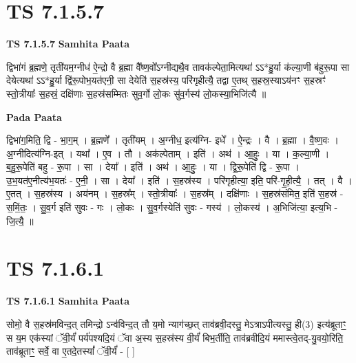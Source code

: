 \documentclass[17pt]{extarticle}
\begin{document}

\section{ TS 7.1.5.7 }

\textbf{TS 7.1.5.7 } \newline
\textbf{Samhita Paata} \newline

द्विभा॑गं ब्र॒ह्मणे॒ तृती॑यम॒ग्नीध॑ ऐ॒न्द्रो वै ब्र॒ह्मा वै᳚ष्ण॒वो᳚ऽग्नीद्यथै॒व तावक॑ल्पेता॒मित्यथा॑ ऽऽ*हु॒र्या क॑ल्या॒णी ब॑हुरू॒पा सा देयेत्यथा॑ ऽऽ*हु॒र्या द्वि॑रू॒पोभ॒यत॑एनी॒ सा देयेति॑ स॒हस्र॑स्य॒ परि॑गृहीत्यै॒ तद्वा ए॒तथ् स॒हस्र॒स्याऽय॑नꣳ स॒हस्रꣳ॑ स्तो॒त्रीयाः᳚ स॒हस्रं॒ दक्षि॑णाः स॒हस्र॑सम्मितः सुव॒र्गो लो॒कः सु॑व॒र्गस्य॑ लो॒कस्या॒भिजि॑त्यै ॥ \newline

\textbf{Pada Paata} \newline

द्विभा॑ग॒मिति॒ द्वि - भा॒ग॒म् । ब्र॒ह्मणे᳚ । तृती॑यम् । अ॒ग्नीध॒ इत्य॑ग्नि- इधे᳚ । ऐ॒न्द्रः । वै । ब्र॒ह्मा । वै॒ष्ण॒वः । अ॒ग्नीदित्य॑ग्नि-इत् । यथा᳚ । ए॒व । तौ । अक॑ल्पेताम् । इति॑ । अथ॑ । आ॒हुः॒ । या । क॒ल्या॒णी । ब॒हु॒रू॒पेति॑ बहु - रू॒पा । सा । देया᳚ । इति॑ । अथ॑ । आ॒हुः॒ । या । द्वि॒रू॒पेति॑ द्वि - रू॒पा । उ॒भ॒यत॑ए॒नीत्य॑भ॒यतः॑ - ए॒नी॒ । सा । देया᳚ । इति॑ । स॒हस्र॑स्य । परि॑गृहीत्या॒ इति॒ परि॑-गृ॒ही॒त्यै॒ । तत् । वै । ए॒तत् । स॒हस्र॑स्य । अय॑नम् । स॒हस्र᳚म् । स्तो॒त्रीयाः᳚ । स॒हस्र᳚म् । दक्षि॑णाः । स॒हस्र॑संमित॒ इति॑ स॒हस्र॑ - स॒मिं॒तः॒ । सु॒व॒र्ग इति॑ सुवः - गः । लो॒कः । सु॒व॒र्गस्येति॑ सुवः - गस्य॑ । लो॒कस्य॑ । अ॒भिजि॑त्या॒ इत्य॒भि - जि॒त्यै॒ ॥  \newline





\section{ TS 7.1.6.1 }

\textbf{TS 7.1.6.1 } \newline
\textbf{Samhita Paata} \newline

सोमो॒ वै स॒हस्र॑मविन्द॒त् तमिन्द्रो ऽन्व॑विन्द॒त् तौ य॒मो न्याग॑च्छ॒त् ताव॑ब्रवी॒दस्तु॒ मेऽत्राऽपीत्यस्तु॒ ही(3) इत्य॑ब्रूताꣳ॒॒ स य॒म एक॑स्यां ॅवी॒र्यं॑ पर्य॑पश्यदि॒यं ॅवा अ॒स्य स॒हस्र॑स्य वी॒र्यं॑ बिभ॒र्तीति॒ ताव॑ब्रवीदि॒यं ममास्त्वे॒तद्-यु॒वयो॒रिति॒ ताव॑ब्रूताꣳ॒॒ सर्वे॒ वा ए॒तदे॒तस्यां᳚ ॅवी॒र्यं॑ - [  ] \newline
\end{document}
